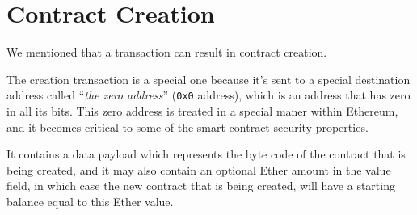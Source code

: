 \section{Contract Creation}\label{contract-creation}

We mentioned that a transaction can result in contract creation.

The creation transaction is a special one because it's sent to a special
destination address called ``\emph{the zero address}'' (\texttt{0x0}
address), which is an address that has zero in all its bits. This zero
address is treated in a special maner within Ethereum, and it becomes
critical to some of the smart contract security properties.

It contains a data payload which represents the byte code of the
contract that is being created, and it may also contain an optional
Ether amount in the value field, in which case the new contract that is
being created, will have a starting balance equal to this Ether value.
